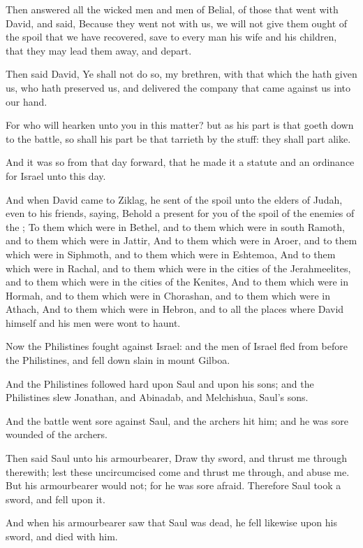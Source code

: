 \Verse Then answered all the wicked men and men of Belial, of those that went with David, and said, Because they went not with us, we will not give them ought of the spoil that we have recovered, save to every man his wife and his children, that they may lead them away, and depart.

\Verse Then said David, Ye shall not do so, my brethren, with that which the \LORD hath given us, who hath preserved us, and delivered the company that came against us into our hand.

\Verse For who will hearken unto you in this matter? but as his part is that goeth down to the battle, so shall his part be that tarrieth by the stuff: they shall part alike.

\Verse And it was so from that day forward, that he made it a statute and an ordinance for Israel unto this day.

\Verse And when David came to Ziklag, he sent of the spoil unto the elders of Judah, even to his friends, saying, Behold a present for you of the spoil of the enemies of the \LORD; \Verse To them which were in Bethel, and to them which were in south Ramoth, and to them which were in Jattir, \Verse And to them which were in Aroer, and to them which were in Siphmoth, and to them which were in Eshtemoa, \Verse And to them which were in Rachal, and to them which were in the cities of the Jerahmeelites, and to them which were in the cities of the Kenites, \Verse And to them which were in Hormah, and to them which were in Chorashan, and to them which were in Athach, \Verse And to them which were in Hebron, and to all the places where David himself and his men were wont to haunt.


\Chapter
\Verse Now the Philistines fought against Israel: and the men of Israel fled from before the Philistines, and fell down slain in mount Gilboa.

\Verse And the Philistines followed hard upon Saul and upon his sons; and the Philistines slew Jonathan, and Abinadab, and Melchishua, Saul's sons.

\Verse And the battle went sore against Saul, and the archers hit him; and he was sore wounded of the archers.

\Verse Then said Saul unto his armourbearer, Draw thy sword, and thrust me through therewith; lest these uncircumcised come and thrust me through, and abuse me. But his armourbearer would not; for he was sore afraid. Therefore Saul took a sword, and fell upon it.

\Verse And when his armourbearer saw that Saul was dead, he fell likewise upon his sword, and died with him.

